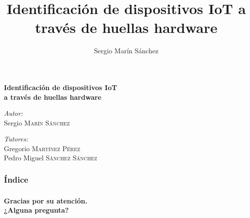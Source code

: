 \documentclass[bigger]{beamer}
\title{Identificación de dispositivos IoT a través de huellas hardware}
\date{\displaydate{fecha}}
\author{Sergio Marín Sánchez
 }
\begin{document}
{ %
\begin{frame}
\rmfamily %
\color{white} %
\vspace{2.3cm}
\begin{center}
    \bfseries
    \Large
    Identificación de dispositivos IoT \\
    a través de huellas hardware
\end{center}
\begin{minipage}{0.5\textwidth}
\begin{flushleft}
\emph{Autor:}\\
Sergio \textsc{Marín Sánchez}\\
\end{flushleft}
\end{minipage}
\begin{minipage}{0.45\textwidth}
\begin{flushright}
\emph{Tutores:} \\
Gregorio \textsc{Martínez Pérez}\\
Pedro Miguel \textsc{Sánchez Sánchez}\\
\end{flushright}
\end{minipage}
\end{frame}
}

\newcommand{\RN}[1]{%
  \ensuremath{\textup{\uppercase\expandafter{\romannumeral#1}}}%
}

{ %
\begin{frame}
\frametitle{Índice} %
\rmfamily %
\color{white}
\tableofcontents[hideallsubsections]
\end{frame}
}











{ %
\begin{frame}
\frametitle{} %
\rmfamily %
\color{white}
\Large\bfseries
\vfill\vspace{3cm}
Gracias por su atención. \\
¿Alguna pregunta? \\
 \\
\vfill

\end{frame}
}
\end{document}
